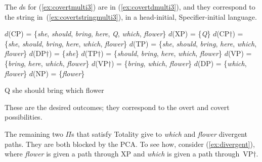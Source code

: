 \documentclass[output=paper]{langsci/langscibook}
\begin{document}
The $d$s for (\ref{ex:covertmulti3}) are in (\ref{ex:covertdmulti3}), and they correspond to the string in~(\ref{ex:covertstringmulti3}), in a head-initial, Specifier-initial language.
\begin{exe}
	\ex \label{ex:covertdmulti3}
	\begin{xlist}
		\ex $d$(CP) = \{\emph{she}, \emph{should}, \emph{bring}, \emph{here}, \emph{Q}, \emph{which}, \emph{flower}\}
		\ex $d$(XP) = \{\emph{Q}\}
		\ex $d$(CP$\dag$) = \{\emph{she}, \emph{should}, \emph{bring}, \emph{here}, \emph{which}, \emph{flower}\}
		\ex $d$(TP) = \{\emph{she}, \emph{should}, \emph{bring}, \emph{here}, \emph{which}, \emph{flower}\}
		\ex $d$(DP$\dag$) = \{\emph{she}\}
		\ex $d$(TP$\dag$) = \{\emph{should}, \emph{bring}, \emph{here}, \emph{which}, \emph{flower}\}
		\ex $d$(VP) = \{\emph{bring}, \emph{here}, \emph{which}, \emph{flower}\}
		\ex $d$(VP$\dag$) = \{\emph{bring}, \emph{which}, \emph{flower}\}
		\ex $d$(DP) = \{\emph{which}, \emph{flower}\}
		\ex $d$(NP) = \{\emph{flower}\}
	\end{xlist}
	\ex \label{ex:covertstringmulti3} Q she should bring which flower
\end{exe}

These are the desired outcomes; they correspond to the overt and covert  possibilities.

The remaining two $\Pi$s that satisfy Totality give to \emph{which} and
\emph{flower} divergent paths. They are both blocked by the \gls{PCA}. To see
how, consider (\ref{ex:divergent}), where \emph{flower} is given a path through
XP and \emph{which} is given a path through~VP$\dag$.%

\end{document}
